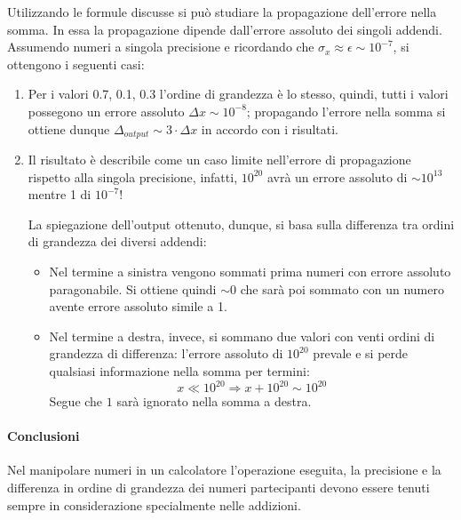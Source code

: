 Utilizzando le formule discusse si può studiare la propagazione dell’errore nella somma.
In essa la propagazione dipende dall’errore assoluto dei singoli addendi.
Assumendo numeri a singola precisione e ricordando che $ \sigma_x \approx \epsilon \sim 10^{-7}$,
si ottengono i seguenti casi:

\begin{enumerate}

	\item Per i valori 0.7, 0.1, 0.3 l’ordine di grandezza è lo stesso, quindi,
	      tutti i valori possegono un errore assoluto $\Delta x \sim 10^{-8}$; propagando
	      l’errore nella somma si ottiene dunque $\Delta_{output} \sim 3 \cdot \Delta x$ in accordo con
	      i risultati.

	\item Il risultato è describile come un caso limite nell’errore di propagazione rispetto
	      alla singola precisione, infatti, $10^{20}$ avrà un errore assoluto di $\sim 10^{13}$
	      mentre 1 di $10^{-7}$!

	      La spiegazione dell'output ottenuto, dunque, si basa sulla differenza
	      tra ordini di grandezza dei diversi addendi:
	      \begin{itemize}
		      \item Nel termine a sinistra
		            vengono sommati prima numeri con errore assoluto paragonabile.
		            Si ottiene quindi $\sim 0$ che sarà poi sommato con un numero
		            avente errore assoluto simile a 1.

		      \item
		            Nel termine a destra, invece, si sommano due valori con venti
		            ordini di grandezza di differenza: l’errore assoluto di
		            $10^{20}$ prevale e si perde qualsiasi informazione nella somma per termini:
		            $$x \ll 10^{20} \Rightarrow x + 10^{20} \sim 10^{20}$$
		            Segue che $\mathit{1}$ sarà ignorato nella somma a destra.
	      \end{itemize}

\end{enumerate}

\paragraph{Conclusioni}
Nel manipolare numeri in un calcolatore l’operazione eseguita, la precisione e
la differenza in ordine di grandezza dei numeri partecipanti devono essere tenuti
sempre in considerazione specialmente nelle addizioni.

